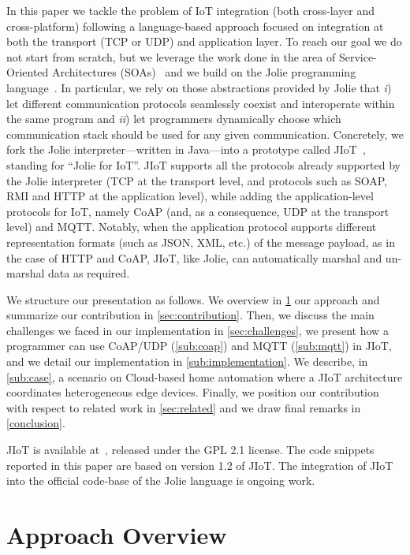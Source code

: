 In this paper we tackle the problem of IoT integration (both cross-layer and
cross-platform) following a language-based approach focused on integration at
both the transport (TCP or UDP) and application layer. To reach our goal we do
not start from scratch, but we leverage the work done in the area of
Service-Oriented Architectures (SOAs)~\cite{Erl07} and we build on the Jolie
programming language~\cite{MONTESI200719,MGZ07,MontesiGZ14,jolie-lang}. In
particular, we rely on those abstractions provided by Jolie that \emph{i}) let
different communication protocols seamlessly coexist and interoperate within
the same program and \emph{ii}) let programmers dynamically choose which
communication stack should be used for any given communication.
%
Concretely, we fork the Jolie interpreter---written in Java---into a prototype
called JIoT~\cite{jiot}, standing for ``Jolie for IoT''.
%
JIoT supports all the protocols already supported by the Jolie interpreter (TCP at the transport level, and protocols such as SOAP, RMI and HTTP at the application level), while adding the application-level protocols for IoT, namely CoAP (and, as a consequence, UDP at the transport level) and MQTT.
Notably, when the application protocol supports different
representation formats (such as JSON, XML, etc.) of the message payload, as in
the case of HTTP and CoAP, JIoT, like Jolie, can automatically marshal and un-marshal data
as required.

We structure our presentation as follows. We overview in \cref{sec:approach}
our approach and summarize our contribution in \cref{sec:contribution}. Then,
we discuss the main challenges we faced in our implementation in
\cref{sec:challenges}, we present how a programmer can use CoAP/UDP
(\cref{sub:coap}) and MQTT (\cref{sub:mqtt}) in JIoT, and we detail our
implementation in \cref{sub:implementation}. We describe, in \cref{sub:case},
a scenario on Cloud-based home automation where a JIoT
architecture coordinates heterogeneous edge devices. Finally, we position our
contribution with respect to related work in \cref{sec:related} and we draw
final remarks in \cref{conclusion}.

JIoT is available at~\cite{jiot}, released under the GPL 2.1 license. The code
snippets reported in this paper are based on version 1.2 of JIoT. The
integration of JIoT into the official code-base of the Jolie language is
ongoing work.

\section{Approach Overview}
\label{sec:approach}

